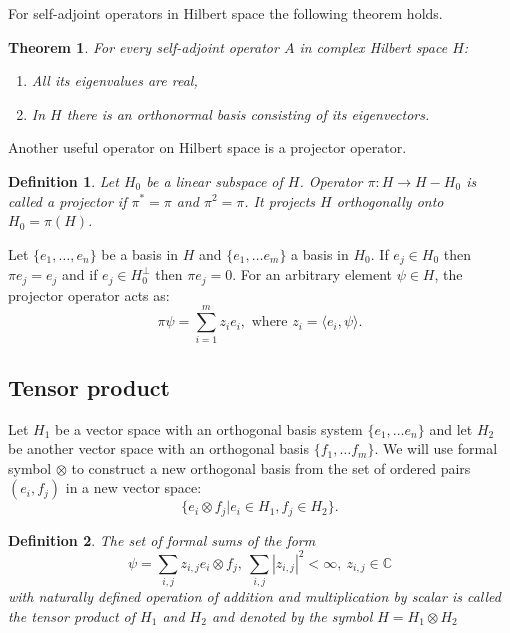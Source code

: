 \documentclass[11pt]{article}
\newtheorem{theorem}{Theorem}[section]
\newtheorem{definition}{Definition}[section]
\begin{document}
For self-adjoint operators in Hilbert space the following theorem holds.
\begin{theorem}
For every self-adjoint operator $A$ in complex Hilbert space $H$:
\begin{enumerate}
\item All its eigenvalues are real,
\item In $H$ there is an orthonormal basis consisting of its eigenvectors.
\end{enumerate}
\end{theorem}

Another useful operator on Hilbert space is a projector operator.
\begin{definition}
Let $H_0$ be a linear subspace of $H$. Operator $\pi: H \to H - H_0$ is called a projector if $\pi^* = \pi$ and $\pi^2 = \pi$. It projects $H$ orthogonally onto $H_0 = \pi(H)$.
\end{definition}
Let $\{e_1, \ldots, e_n\}$ be a basis in $H$ and $\{e_1, \ldots e_m\}$ a basis in $H_0$. If $e_j \in H_0$ then $\pi e_j = e_j$ and if $e_j\in H_0^\perp$ then $\pi e_j = 0$. For an arbitrary element $\psi\in H$, the projector operator acts as: 
\[
\pi\psi = \sum_{i = 1}^m z_ie_i, \mbox{ where } z_i = \langle e_i, \psi\rangle.
\]

\subsection{Tensor product}
Let $H_1$ be a vector space with an orthogonal basis system $\{e_1, \ldots e_n\}$ and let $H_2$ be another vector space with an orthogonal basis $\{f_1,\ldots f_m\}$. We will use formal symbol $\otimes$ to construct a new orthogonal basis from the set of ordered pairs $(e_i, f_j)$ in a new vector space:
\begin{equation}
\{e_i \otimes f_j | e_i \in H_1, f_j \in H_2\}. \label{eq:tensor_basis}
\end{equation}

\begin{definition}
The set of formal sums of the form
\begin{equation}
\psi = \sum_{i,j}z_{i,j}e_i\otimes f_j,\ \sum_{i, j}|z_{i,j}|^2 < \infty,\  z_{i,j} \in \mathbb{C}
\label{eq:tensor_element}
\end{equation}
with naturally defined operation of addition and multiplication by scalar is called the tensor product of $H_1$ and $H_2$ and denoted by the symbol $H = H_1\otimes H_2$
\end{definition}
\end{document}
